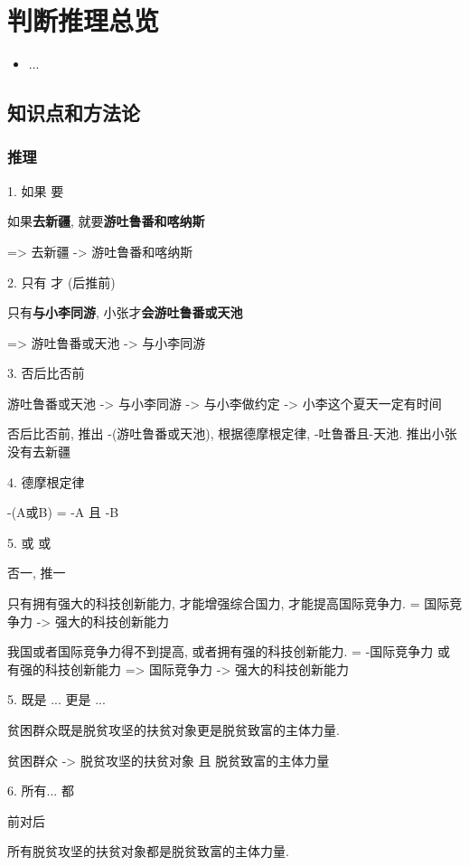 \chapter{判断推理总览}
\label{chap1}
\begin{itemize}[noitemsep,topsep=0pt,parsep=0pt,partopsep=0pt]
	\item ...
\end{itemize}

\section{知识点和方法论}
\subsection{推理}

1. 如果    要

如果\textbf{去新疆}, 就要\textbf{游吐鲁番和喀纳斯}

=> 去新疆 -> 游吐鲁番和喀纳斯

2. 只有   才 (后推前)

只有\textbf{与小李同游}, 小张才\textbf{会游吐鲁番或天池}

=> 游吐鲁番或天池 -> 与小李同游

3. 否后比否前


游吐鲁番或天池 -> 与小李同游 -> 与小李做约定 -> 小李这个夏天一定有时间

否后比否前, 推出 -(游吐鲁番或天池), 根据德摩根定律, -吐鲁番且-天池. 推出小张没有去新疆

4. 德摩根定律

-(A或B) = -A 且 -B


5. 或 或

否一, 推一

只有拥有强大的科技创新能力, 才能增强综合国力, 才能提高国际竞争力. = 国际竞争力 -> 强大的科技创新能力

我国或者国际竞争力得不到提高, 或者拥有强的科技创新能力. = -国际竞争力 或 有强的科技创新能力 => 国际竞争力 -> 强大的科技创新能力

5. 既是 ... 更是 ...

贫困群众既是脱贫攻坚的扶贫对象更是脱贫致富的主体力量.

贫困群众 -> 脱贫攻坚的扶贫对象 且 脱贫致富的主体力量

6. 所有... 都

前对后

所有脱贫攻坚的扶贫对象都是脱贫致富的主体力量.


